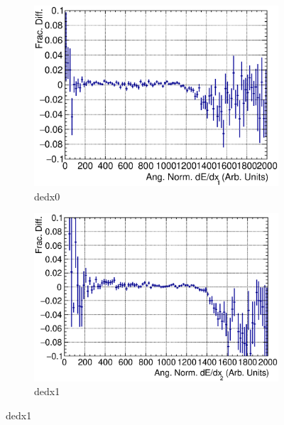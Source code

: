   \begin{figure}[t]
      \centering
      \begin{subfigure}{\dbfigwid\textwidth}
           \includegraphics[width=\textwidth]{figures/sel/fig53a.eps}
           \caption{dedx0}
           \label{subfig:ans-dedx0-ppr-slice}
      \end{subfigure}
      \begin{subfigure}{\dbfigwid\textwidth}
           \includegraphics[width=\textwidth]{figures/sel/fig53b.eps}
           \caption{dedx1}
           \label{subfig:dedx1}
      \end{subfigure}

\end{figure}
